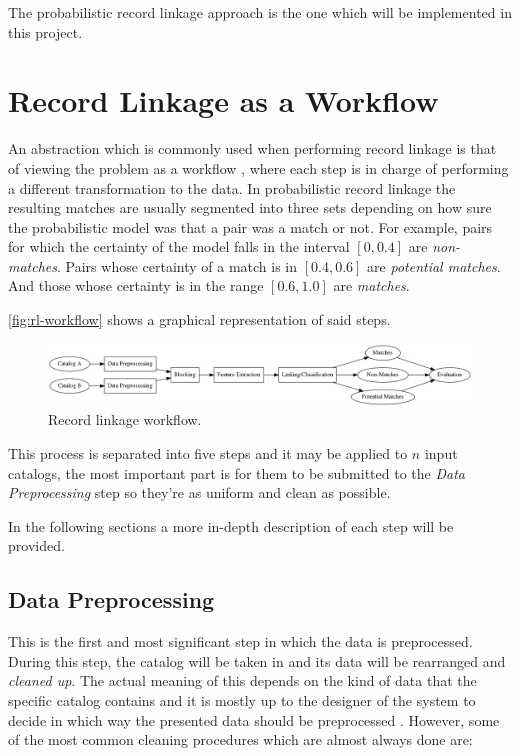 \documentclass[epsfig,a4paper,11pt,titlepage,twoside,openany]{book}
\begin{document}
The probabilistic record linkage approach is the one which will be implemented in this project.


\section{Record Linkage as a Workflow}
\label{sec:rl-as-a-workflow}

An abstraction which is commonly used when performing record linkage is that of viewing the problem as a workflow \cite{christen12_data}, where each step is in charge of performing a different transformation to the data. In probabilistic record linkage \cite{fellegi69_theor_recor_linkag} the resulting matches are usually segmented into three sets depending on how sure the probabilistic model was that a pair was a match or not. For example, pairs for which the certainty of the model falls in the interval $[0, 0.4]$ are \textit{non-matches}. Pairs whose certainty of a match is in $[0.4, 0.6]$ are \textit{potential matches}. And those whose certainty is in the range $[0.6, 1.0]$ are \textit{matches}.

\autoref{fig:rl-workflow} shows a graphical representation of said steps.

\begin{figure}[H]
  \centering \includegraphics[width=\textwidth]{rl-workflow}
  \caption{Record linkage workflow.}
  \label{fig:rl-workflow}
\end{figure}

This process is separated into five steps and it may be applied to $n$ input catalogs, the most important part is for them to be submitted to the \textit{Data Preprocessing} step so they're as uniform and clean as possible. 



In the following sections a more in-depth description of each step will be provided.


\subsection{Data Preprocessing}
\label{sec:rl-workflow-data-preprocessing}

This is the first and most significant step in which the data is preprocessed. During this step, the catalog will be taken in and its data will be rearranged and \textit{cleaned up}. The actual meaning of this depends on the kind of data that the specific catalog
contains and it is mostly up to the designer of the system to decide in which way the presented data
should be preprocessed \cite{Rahm00datacleaning}. 
However, some of the most common cleaning procedures which are almost always done are:
\end{document}
